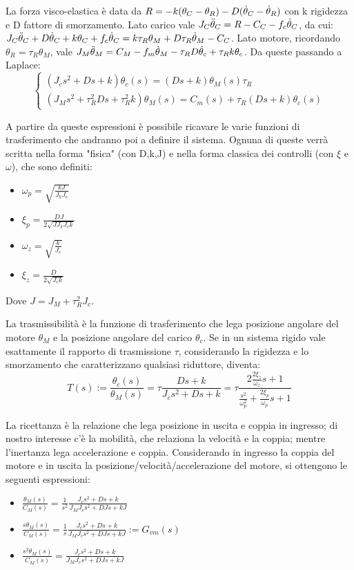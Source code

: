 La forza visco-elastica è data da \(R = -k(\theta_C - \theta_R) - D(\dot{\theta}_C - \dot{\theta}_R) \) con k rigidezza e D fattore di smorzamento.
Lato carico vale \(J_C \Ddot{\theta}_C = R - C_C - f_c \dot{\theta}_C\), da cui: \(J_C \Ddot{\theta}_C + D\dot{\theta}_C + k\theta_C + f_c \dot{\theta}_C = k \tau_R \theta_M + D \tau_R \dot{\theta}_M - C_C\).
Lato motore, ricordando \(\theta_R = \tau_R \theta_M\), vale \(J_M \Ddot{\theta}_M = C_M - f_m \dot{\theta}_M - \tau_R D \dot{\theta}_c + \tau_R k \theta_c\).
Da queste passando a Laplace:
\[
\begin{cases}
    (J_c s^2 + D s + k) \theta_c(s) = (D s + k)\theta_M(s) \tau_R \\
    (J_M s^2 + \tau_R^2 D s + \tau_R^2 k)\theta_M(s) = C_m(s) + \tau_R (D s + k)\theta_c(s)
\end{cases}
\]

A partire da queste espressioni è possibile ricavare le varie funzioni di trasferimento che andranno poi a definire il sistema. Ognuna di queste verrà scritta nella forma "fisica" (con D,k,J) e nella forma classica dei controlli (con \(\xi\) e \(\omega\)), che sono definiti:
\begin{itemize}
    \item \(\omega_p = \sqrt{\frac{k J}{J_k J_c}}\)
    \item \(\xi_p = \frac{D J}{2 \sqrt{J J_k J_c k}}\)
    \item \(\omega_z = \sqrt{\frac{k}{J_c}}\)
    \item \(\xi_z = \frac{D}{2\sqrt{J_c k}}\)
\end{itemize}
Dove \(J = J_M + \tau_R^2 J_c\).

La trasmissibilità è la funzione di trasferimento che lega posizione angolare del motore \(\theta_M\) e la posizione angolare del carico \(\theta_c\). Se in un sistema rigido vale esattamente il rapporto di trasmissione \(\tau\), considerando la rigidezza e lo smorzamento che caratterizzano qualsiasi riduttore, diventa:
\[ T(s) := \frac{\theta_c(s)}{\theta_M(s)}=\tau \frac{D s + k}{J_c s^2 + D s +k} = \tau \frac{2\frac{2\xi_z}{\omega_z} s + 1}{\frac{s^2}{\omega_p^2} + \frac{2\xi_p}{\omega_p} s + 1}\]

La ricettanza è la relazione che lega posizione in uscita e coppia in ingresso; di nostro interesse c'è la mobilità, che relaziona la velocità e la coppia; mentre l'inertanza lega accelerazione e coppia.
Considerando in ingresso la coppia del motore e in uscita la posizione/velocità/accelerazione del motore, si ottengono le seguenti espressioni:
\begin{itemize}
    \item \(\frac{\theta_M(s)}{C_M(s)} = \frac{1}{s^2} \frac{J_c s^2 + D s + k}{J_M J_c s^2 + D J s + k J} \)
    \item \(\frac{s \theta_M(s)}{C_M(s)} = \frac{1}{s} \frac{J_c s^2 + D s + k}{J_M J_c s^2 + D J s + k J} := G_{vm}(s) \)
    \item \(\frac{s^2 \theta_M(s)}{C_M(s)} = \frac{J_c s^2 + D s + k}{J_M J_c s^2 + D J s + k J} \)
\end{itemize}

